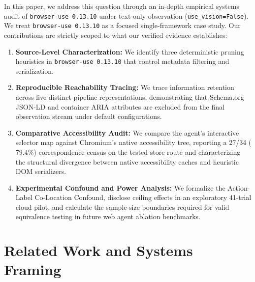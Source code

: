 \documentclass[11pt,a4paper]{article}
\begin{document}
In this paper, we address this question through an in-depth empirical systems audit of \texttt{browser-use 0.13.10} under text-only observation (\texttt{use\_vision=False}). We treat \texttt{browser-use 0.13.10} as a focused single-framework case study. Our contributions are strictly scoped to what our verified evidence establishes:
\begin{enumerate}
    \item \textbf{Source-Level Characterization:} We identify three deterministic pruning heuristics in \texttt{browser-use 0.13.10} that control metadata filtering and serialization.
    \item \textbf{Reproducible Reachability Tracing:} We trace information retention across five distinct pipeline representations, demonstrating that Schema.org JSON-LD and container ARIA attributes are excluded from the final observation stream under default configurations.
    \item \textbf{Comparative Accessibility Audit:} We compare the agent's interactive selector map against Chromium's native accessibility tree, reporting a 27/34 ($79.4\%$) correspondence census on the tested store route and characterizing the structural divergence between native accessibility caches and heuristic DOM serializers.
    \item \textbf{Experimental Confound and Power Analysis:} We formalize the Action-Label Co-Location Confound, disclose ceiling effects in an exploratory 41-trial cloud pilot, and calculate the sample-size boundaries required for valid equivalence testing in future web agent ablation benchmarks.
\end{enumerate}

\section{Related Work and Systems Framing}
\label{sec:related}
\end{document}
